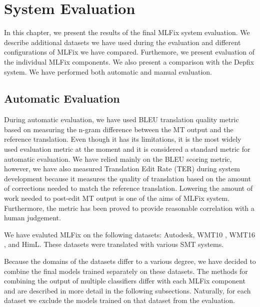 \chapter{System Evaluation}
\label{chap:eval}

In this chapter, we present the results of the final MLFix system evaluation.
We describe additional datasets we have used during the evaluation and different
configurations of MLFix we have compared. Furthemore, we present evaluation
of the individual MLFix components.
We also present a comparison with the Depfix
system. We have performed both automatic and manual evaluation.

\section{Automatic Evaluation}

During automatic evaluation, we have used BLEU \citep{papineni:2002} translation
quality metric based on measuring the n-gram difference between the MT output
and the reference translation.
Even though it has its limitations, it is the most widely used
evaluation metric at the moment and it is considered a standard metric for automatic evaluation.
We have relied mainly on the BLEU scoring metric, however, we have 
also measured Translation Edit Rate (TER) \citep{Snover06astudy} during system development because it measures
the quality of translation based on the amount of corrections needed to match
the reference translation. Lowering the amount of work needed to post-edit MT output
is one of the aims of MLFix system. Furthermore, the metric has been proved to provide
reasonable correlation with a human judgement.

We have evaluted MLFix on the following datasets: Autodesk, WMT10\linebreak
\citep{callisonburch-EtAl:2010:WMT}, WMT16 \citep{bojar-EtAl:2016:WMT1}, and HimL.
These datasets
were translated with various SMT systems.

Because the domains of the datasets differ to a various degree,
we have decided to combine the final models trained separately
on these datasets. The methods for combining the output of multiple classifiers
differ with each MLFix component and are described in more detail in the following
subsections.
Naturally, for each dataset we exclude the models trained on that dataset from
the evaluation.


